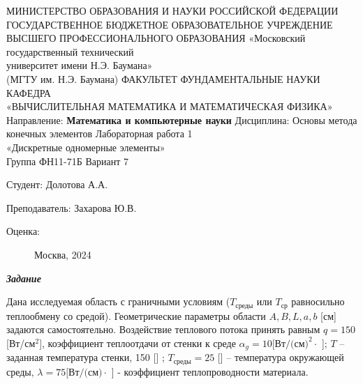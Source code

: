 \documentclass[a4paper, 12pt]{article}
\begin{document}
	\pagestyle{empty}
	\begin{center}
		МИНИСТЕРСТВО ОБРАЗОВАНИЯ И НАУКИ РОССИЙСКОЙ ФЕДЕРАЦИИ \\ ГОСУДАРСТВЕННОЕ БЮДЖЕТНОЕ ОБРАЗОВАТЕЛЬНОЕ УЧРЕЖДЕНИЕ \\ 
		ВЫСШЕГО ПРОФЕССИОНАЛЬНОГО ОБРАЗОВАНИЯ
		\vskip 1.5cm
		«Московский государственный технический \\
		университет имени Н.Э. Баумана» \\
		(МГТУ им. Н.Э. Баумана)
		\vskip 1.5cm
		ФАКУЛЬТЕТ ФУНДАМЕНТАЛЬНЫЕ НАУКИ \\
		КАФЕДРА \\
		«ВЫЧИСЛИТЕЛЬНАЯ МАТЕМАТИКА И МАТЕМАТИЧЕСКАЯ ФИЗИКА»
		\vskip 0.4cm
		Направление: \textbf{Математика и компьютерные науки}
		\vskip 0.4cm
		Дисциплина: Основы метода конечных элементов
		\vskip 0.4cm
		Лабораторная работа 1 \\
		«Дискретные одномерные элементы» \\
		Группа ФН11-71Б
		\vskip 0.2cm
		Вариант 7
		
		
		\vskip 1.5cm
		\begin{flushright}
			Студент: Долотова А.А.
			
			\vskip 1.5cm
			
			Преподаватель: Захарова Ю.В.
		\end{flushright}
		Оценка:
		
		\begin{figure}[b]
			\begin{center}
				Москва, 2024
			\end{center}
		\end{figure}
		
	\end{center}
	
	\newpage
	\pagestyle{plain}

\begin{center}
\textbf{\textit{Задание}}
\end{center}

Дана исследуемая область с граничными условиям ($T_{\text{среды}}$ или $T_{\text{ср}}$ равносильно теплообмену со средой). Геометрические параметры области $A, B, L, a, b$ [см] задаются самостоятельно. Воздействие теплового потока принять равным  $q = 150$ [Вт/$\text{см}^2$], коэффициент теплоотдачи от стенки к среде 
$\alpha_g = 10 [\text{Вт/(см)}^2\cdot$ \celsius]; $T$ – заданная температура стенки, 150 [\celsius] ;  $T_{\text{среды}} = 25$ [\celsius] -- температура окружающей среды,  $\lambda = 75 [\text{Вт/(см)}\cdot$ \celsius]  - коэффициент теплопроводности материала. \\
\end{document}
